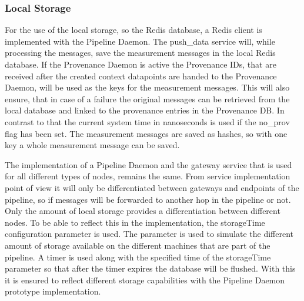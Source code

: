 \subsubsection{Local Storage}
For the use of the local storage, so the Redis database, a Redis client is implemented with the Pipeline Daemon. The push\_data service will, while processing the messages, save the measurement messages in the local Redis database. If the Provenance Daemon is active the Provenance IDs, that are received after the created context datapoints are handed to the Provenance Daemon, will be used as the keys for the measurement messages. This will also ensure, that in case of a failure the original messages can be retrieved from the local database and linked to the provenance entries in the Provenance DB. In contrast to that the current system time in nanoseconds is used if the no\_prov flag has been set. The measurement messages are saved as hashes, so with one key a whole measurement message can be saved.

The implementation of a Pipeline Daemon and the gateway service that is used for all different types of nodes, remains the same. From service implementation point of view it will only be differentiated between gateways and endpoints of the pipeline, so if messages will be forwarded to another hop in the pipeline or not. Only the amount of local storage provides a differentiation between different nodes. To be able to reflect this in the implementation, the storageTime configuration parameter is used. The parameter is used to simulate the different amount of storage available on the different machines that are part of the pipeline. A timer is used along with the specified time of the storageTime parameter so that after the timer expires the database will be flushed. With this it is ensured to reflect different storage capabilities with the Pipeline Daemon prototype implementation.